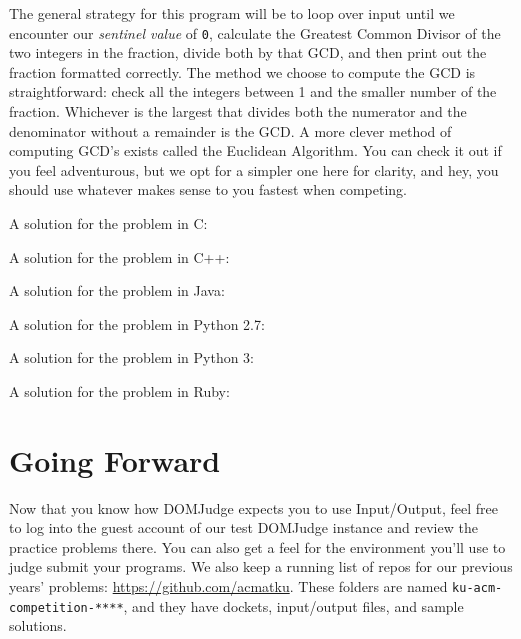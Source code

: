\documentclass[a4paper]{article}
\def \previousProblemsRepo {https://github.com/acmatku}
\begin{document}
The general strategy for this program will be to loop over input until we encounter our \textit{sentinel value} of \texttt{0}, calculate the Greatest Common Divisor of the two integers in the fraction, divide both by that GCD, and then print out the fraction formatted correctly. The method we choose to compute the GCD is straightforward: check all the integers between 1 and the smaller number of the fraction. Whichever is the largest that divides both the numerator and the denominator without a remainder is the GCD. A more clever method of computing GCD's exists called the Euclidean Algorithm. You can check it out if you feel adventurous, but we opt for a simpler one here for clarity, and hey, you should use whatever makes sense to you fastest when competing. 
\newpage

A solution for the problem in C:

\newpage

A solution for the problem in C++:

\newpage

A solution for the problem in Java:

\newpage

A solution for the problem in Python 2.7:

\newpage

A solution for the problem in Python 3:

\newpage

A solution for the problem in Ruby:


\newpage

\section{Going Forward}
Now that you know how DOMJudge expects you to use Input/Output, feel free to log into the guest account of our test DOMJudge instance and review the practice problems there. You can also get a feel for the environment you'll use to judge submit your programs. We also keep a running list of repos for our previous years' problems: \url{\previousProblemsRepo}. These folders are named \texttt{ku-acm-competition-****}, and they have dockets, input/output files, and sample solutions.
\end{document}
